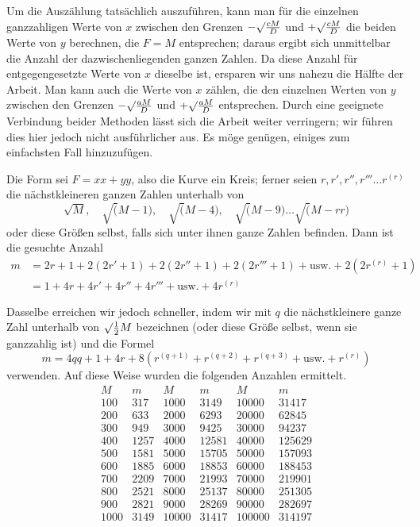 Um die Auszählung tatsächlich auszuführen, kann man für die einzelnen ganzzahligen Werte von $x$ zwischen den Grenzen $-\surd\frac{cM}D$ und $+\surd\frac{cM}D$ die beiden Werte von $y$ berechnen, die $F=M$ entsprechen; daraus ergibt sich unmittelbar die Anzahl der dazwischenliegenden ganzen Zahlen. Da diese Anzahl für entgegengesetzte Werte von $x$ dieselbe ist, ersparen wir uns nahezu die Hälfte der Arbeit. Man kann auch die Werte von $x$ zählen, die den einzelnen Werten von $y$ zwischen den Grenzen $-\surd\frac{aM}D$ und $+\surd\frac{aM}D$ entsprechen. Durch eine geeignete Verbindung beider Methoden lässt sich die Arbeit weiter verringern; wir führen dies hier jedoch nicht ausführlicher aus. Es möge genügen, einiges zum einfachsten Fall hinzuzufügen.

Die Form sei $F=xx+yy$, also die Kurve ein Kreis; ferner seien $r,r',r'',r'''\ldots r^{(r)}$ die nächstkleineren ganzen Zahlen unterhalb von
\[
\surd M,\quad\surd(M-1),\quad\surd(M-4),\quad\surd(M-9)\ldots\surd(M-rr)
\]
oder diese Größen selbst, falls sich unter ihnen ganze Zahlen befinden. Dann ist die gesuchte Anzahl
\[
\begin{aligned}
m&=2r+1+2(2r'+1)+2(2r''+1)+2(2r'''+1)+\text{usw.}+2(2r^{(r)}+1)\\
&=1+4r+4r'+4r''+4r'''+\text{usw.}+4r^{(r)}
\end{aligned}
\]

Dasselbe erreichen wir jedoch schneller, indem wir mit $q$ die nächstkleinere ganze Zahl
unterhalb von $\surd\tfrac12 M$ bezeichnen (oder diese Größe selbst, wenn sie ganzzahlig ist) und die Formel
\[
m=4qq+1+4r+8(r^{(q+1)}+r^{(q+2)}+r^{(q+3)}+\text{usw.}+r^{(r)})
\]
verwenden. Auf diese Weise wurden die folgenden Anzahlen ermittelt.
\[
\begin{array}{r|r||r|r||r|r}
M&m&M&m&M&m\\\hline
100&317&1000&3149&10000&31417\\
200&633&2000&6293&20000&62845\\
300&949&3000&9425&30000&94237\\
400&1257&4000&12581&40000&125629\\
500&1581&5000&15705&50000&157093\\
600&1885&6000&18853&60000&188453\\
700&2209&7000&21993&70000&219901\\
800&2521&8000&25137&80000&251305\\
900&2821&9000&28269&90000&282697\\
1000&3149&10000&31417&100000&314197
\end{array}
\]

